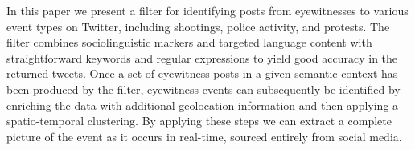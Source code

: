In this paper we present a filter for identifying posts from eyewitnesses to various event types on Twitter, including shootings, police activity, and protests. The filter combines sociolinguistic markers and targeted language content with straightforward keywords and regular expressions to yield good accuracy in the returned tweets. Once a set of eyewitness posts in a given semantic context has been produced by the filter, eyewitness events can subsequently be identified by enriching the data with additional geolocation information and then applying a spatio-temporal clustering. By applying these steps we can extract a complete picture of the event as it occurs in real-time, sourced entirely from social media.
